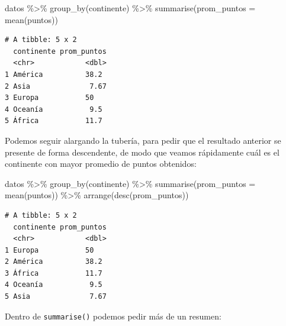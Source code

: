 \documentclass[
]{book}
\newenvironment{Shaded}{\begin{snugshade}}{\end{snugshade}}
\newcommand{\AttributeTok}[1]{\textcolor[rgb]{0.77,0.63,0.00}{#1}}
\newcommand{\FunctionTok}[1]{\textcolor[rgb]{0.00,0.00,0.00}{#1}}
\newcommand{\NormalTok}[1]{#1}
\newcommand{\SpecialCharTok}[1]{\textcolor[rgb]{0.00,0.00,0.00}{#1}}
\begin{document}
\begin{Shaded}
\begin{Highlighting}[]
\NormalTok{datos }\SpecialCharTok{\%\textgreater{}\%} 
    \FunctionTok{group\_by}\NormalTok{(continente) }\SpecialCharTok{\%\textgreater{}\%} 
    \FunctionTok{summarise}\NormalTok{(}\AttributeTok{prom\_puntos =} \FunctionTok{mean}\NormalTok{(puntos))}
\end{Highlighting}
\end{Shaded}

\begin{verbatim}
# A tibble: 5 x 2
  continente prom_puntos
  <chr>            <dbl>
1 América          38.2 
2 Asia              7.67
3 Europa           50   
4 Oceanía           9.5 
5 África           11.7 
\end{verbatim}

Podemos seguir alargando la tubería, para pedir que el resultado anterior se presente de forma descendente, de modo que veamos rápidamente cuál es el continente con mayor promedio de puntos obtenidos:

\begin{Shaded}
\begin{Highlighting}[]
\NormalTok{datos }\SpecialCharTok{\%\textgreater{}\%} 
    \FunctionTok{group\_by}\NormalTok{(continente) }\SpecialCharTok{\%\textgreater{}\%} 
    \FunctionTok{summarise}\NormalTok{(}\AttributeTok{prom\_puntos =} \FunctionTok{mean}\NormalTok{(puntos)) }\SpecialCharTok{\%\textgreater{}\%} 
    \FunctionTok{arrange}\NormalTok{(}\FunctionTok{desc}\NormalTok{(prom\_puntos))}
\end{Highlighting}
\end{Shaded}

\begin{verbatim}
# A tibble: 5 x 2
  continente prom_puntos
  <chr>            <dbl>
1 Europa           50   
2 América          38.2 
3 África           11.7 
4 Oceanía           9.5 
5 Asia              7.67
\end{verbatim}

Dentro de \texttt{summarise()} podemos pedir más de un resumen:
\end{document}
